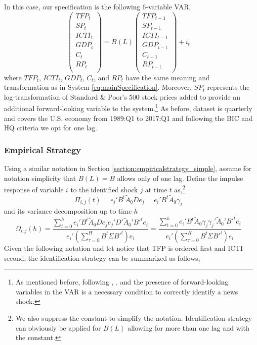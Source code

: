 \documentclass[12pt]{article}
\begin{document}
In this case, our specification is the following 6-variable VAR,
\begin{equation}\label{eq:newsSpecification}
\begin{pmatrix}
TFP_t \\ 
SP_t \\
ICTI_t \\
GDP_t \\
C_t \\
RP_t \\
\end{pmatrix} = B(L) \begin{pmatrix}
TFP_{t-1} \\ 
SP_{t-1} \\
ICTI_{t-1} \\
GDP_{t-1} \\
C_{t-1} \\
RP_{t-1} \\
\end{pmatrix} + i_t
\end{equation}
where $TFP_t$, $ICTI_t$, $GDP_t$, $C_t$, and $RP_t$ have the same meaning and transformation as in System \ref{eq:mainSpecification}. Moreover, $SP_t$ represents the log-transformation of Standard \& Poor's 500 stock prices added to provide an additional forward-looking variable to the system.\footnote{As mentioned before, following \cite{sims2012news}, \cite{forni2014sufficient}, and \cite{barsky2015whither} the presence of forward-looking variables in the VAR is a necessary condition to correctly identify a news shock.} As before, dataset is quarterly and covers the U.S. economy from 1989:Q1 to 2017:Q1 and following the BIC and HQ criteria we opt for one lag.

\subsubsection*{Empirical Strategy}

Using a similar notation in Section \ref{section:empiricalstrategy_simple}, assume for notation simplicity that $B(L) = B$ allows only of one lag. Define the impulse response of variable $i$ to the identified shock $j$ at time $t$ as,\footnote{We also suppress the constant to simplify the notation. Identification strategy can obviously be applied for $B(L)$ allowing for more than one lag and with the constant.}
$$
\Pi_{i,j}(t) = e_i' B^t \tilde{A}_0 D e_j = e_i' B^t \tilde{A}_0 \gamma_j
$$
and its variance decomposition up to time $h$
$$
\Omega_{i,j}(h) = \frac{ \sum_{t=0}^h e_i' B^t \tilde{A}_0 D e_j e_j' D' \tilde{A}_0' B'^t e_i } {e_i'( \sum_{\tau = 0}^H B^t \Sigma B'^t )e_i} = \frac{ \sum_{t=0}^h e_i' B^t \tilde{A}_0 \gamma_j \gamma_j' \tilde{A}_0' B'^t e_i } {e_i'( \sum_{\tau = 0}^H B^t \Sigma B'^t )e_i}
$$
Given the following notation and let notice that TFP is ordered first and ICTI second, the identification strategy can be summarized as follows,
\end{document}
